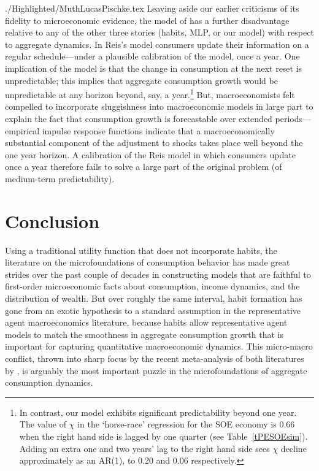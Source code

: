 \begin{verbatimwrite}{./Highlighted/MuthLucasPischke.tex}
  Leaving aside our earlier criticisms of its fidelity to microeconomic evidence, the model of \cite{reis:inattentive} has a further disadvantage relative to any of the other three stories (habits, MLP, or our model) with respect to aggregate dynamics. In Reis's model consumers update their information on a regular schedule---under a plausible calibration of the model, once a year. One implication of the model is that the change in consumption at the next reset is unpredictable; this implies that aggregate consumption growth would be unpredictable at any horizon beyond, say, a year.\footnote{In contrast, our model exhibits significant predictability beyond one year. The value of $\chi$ in the `horse-race' regression for the SOE economy is 0.66 when the right hand side is lagged by one quarter (see Table~\ref{tPESOEsim}). Adding an extra one and two years' lag to the right hand side sees $\chi$ decline approximately as an AR(1), to 0.20 and 0.06 respectively.}  But, macroeconomists felt compelled to incorporate sluggishness into macroeconomic models in large part to explain the fact that consumption growth is forecastable over extended periods---empirical impulse response functions indicate that a macroeconomically substantial component of the adjustment to shocks takes place well beyond the one year horizon.  A calibration of the Reis model in which consumers update once a year therefore fails to solve a large part of the original problem (of medium-term predictability).

\end{verbatimwrite}



\section{Conclusion} \label{sec:Conclusion}

Using a traditional utility function that does not incorporate habits, the literature on the microfoundations of consumption behavior has made great strides over the past couple of decades in constructing models that are faithful to first-order microeconomic facts about consumption, income dynamics, and the distribution of wealth.  But over roughly the same interval, habit formation has gone from an exotic hypothesis to a standard assumption in the representative agent macroeconomics literature, because habits allow representative agent models to match the smoothness in aggregate consumption growth that is important for capturing quantitative macroeconomic dynamics.  This micro-macro conflict, thrown into sharp focus by the recent meta-analysis of both literatures by \cite{hrsHabit}, is arguably the most important puzzle in the microfoundations of aggregate consumption dynamics.

